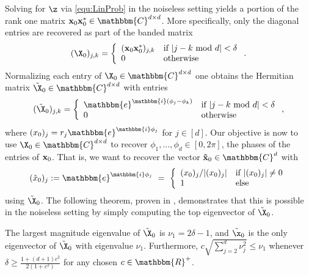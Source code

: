 Solving for $\z$ via \eqref{equ:LinProb} in the noiseless setting yields a portion of the rank one matrix ${\bf x}_0 {\bf x}_0^*\in \mathbbm{C}^{d \times d}$.  More specifically, only the diagonal entries are recovered as part of the banded matrix
\begin{equation}
(\X_0)_{j,k} =  \left\{ \begin{array}{ll} ({\bf x}_0 {\bf x}_0^*)_{j,k} & \textrm{if}~| j - k ~{\rm mod}~d | < \delta \\ 0 & \textrm{otherwise} \end{array} \right..
\label{equ:PhaseMatrix}
\end{equation}
Normalizing each entry of $\X_0 \in \mathbbm{C}^{d \times d}$ one obtains the Hermitian matrix $\tilde{\X}_0 \in \mathbbm{C}^{d \times d}$ with entries
\begin{equation}
(\tilde{\X}_0)_{j,k} =  \left\{ \begin{array}{ll} \mathbbm{e}^{\mathbbm{i}(\phi_j - \phi_k)} & \textrm{if}~| j - k ~{\rm mod}~d | < \delta \\ 0 & \textrm{otherwise} \end{array} \right.,
\label{equ:MatrixofPhases}
\end{equation}
where $(x_0)_j = r_j \mathbbm{e}^{\mathbbm{i} \phi_j}$ for $j \in [d]$.  Our objective is now to use $\X_0 \in \mathbbm{C}^{d \times d}$ to recover $\phi_1, \dots, \phi_d \in [0, 2 \pi]$, the phases of the entries of ${\bf x}_0$.  That is, we want to recover the vector ${\bf \tilde{x}}_0 \in \mathbbm{C}^d$ with 
\begin{equation}
(\tilde{x}_0)_j := \mathbbm{e}^{\mathbbm{i}\phi_j} ~=~ \left\{\begin{array}{ll} (x_0)_j / |(x_0)_j| & \textrm{if}~|(x_0)_j| \neq 0\\ 1 & \textrm{else} \end{array} \right.
\label{Def:VecofPhases}
\end{equation} 
using $\tilde{\X}_0$.  The following theorem, proven in \cite{IV_SPIE}, demonstrates that this is possible in the noiseless setting by simply computing the top eigenvector of $\tilde{\X}_0$.  

\begin{thm}
The largest magnitude eigenvalue of $\tilde{\X}_0$ is $\nu_1 = 2 \delta -1$, and $\tilde{\x}_0$ is the only eigenvector of $\tilde{\X}_0$ with eigenvalue $\nu_1$.  Furthermore, $c \sqrt{\sum^d_{j=2} \nu^2_j} \leq \nu_1$ whenever $\delta \geq \frac{1+(d+1) c^2}{2(1+c^2)}$ for any chosen $c \in \mathbbm{R}^+$.
\label{thm:Noiseless_Spectrum}
\end{thm}

